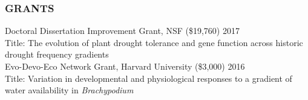 \documentclass[12pt,english]{article}
\begin{document}

\subsubsection*{GRANTS}
\vspace{-0.5ex}
\hspace*{1.0em} Doctoral Dissertation Improvement Grant, NSF (\$19,760)
\hfill 
2017\\
\hspace*{2.0em} Title: The evolution of plant drought tolerance and gene function across historic \hspace*{2.0em}drought frequency gradients 
\vspace{1ex}\\
\hspace*{1.0em} Evo-Devo-Eco Network Grant, Harvard University (\$3,000)
\hfill 
2016\\
\hspace*{2.0em} Title: Variation  in  developmental  and  physiological  responses  to  a  gradient  of  water  \hspace*{2.0em} availability in \textit{Brachypodium} 
\vspace{1ex}

\end{document}
